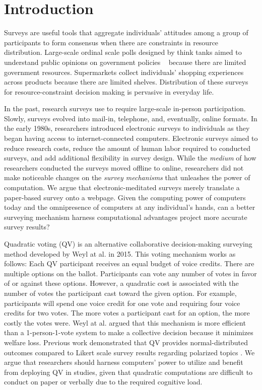 \section{Introduction}

Surveys are useful tools that aggregate individuals' attitudes among a group of participants to form consensus when there are constraints in resource distribution. 
Large-scale ordinal scale polls designed by think tanks aimed to understand public opinions on government policies ~\cite{pew} because there are limited government resources. 
Supermarkets collect individuals' shopping experiences across products because there are limited shelves.
Distribution of these surveys for resource-constraint decision making is pervasive in everyday life.

In the past, research surveys use to require large-scale in-person participation. 
Slowly, surveys evolved into mail-in, telephone, and, eventually, online formats.
In the early 1980s, researchers introduced electronic surveys to individuals as they began having access to internet-connected computers. 
Electronic surveys aimed to reduce research costs, reduce the amount of human labor required to conducted surveys, and add additional flexibility in survey design. 
While the \textit{medium} of how researchers conducted the surveys moved offline to online, researchers did not make noticeable changes on the \textit{survey mechanisms} that unleashes the power of computation. 
We argue that electronic-meditated surveys merely translate a paper-based survey onto a webpage.
Given the computing power of computers today and the omnipresence of computers at any individual's hands, can a better surveying mechanism harness computational advantages project more accurate survey results?

Quadratic voting (QV) is an alternative collaborative decision-making surveying method developed by Weyl at al. \cite{posner2018radical} in 2015. 
This voting mechanism works as follows: Each QV participant receives an equal budget of voice credits. 
There are multiple options on the ballot. Participants can vote any number of votes in favor of or against these options.
However, a quadratic cost is associated with the number of votes the participant cast toward the given option. For example, participants will spend one voice credit for one vote and requiring four voice credits for two votes. The more votes a participant cast for an option, the more costly the votes were. Weyl at al. argued that this mechanism is more efficient than a 1-person-1-vote system to make a collective decision because it minimizes welfare loss. Previous work demonstrated that QV provides normal-distributed outcomes compared to Likert scale survey results regarding polarized topics \cite{quarfoot2017quadratic}. 
We argue that researchers should harness computers' power to utilize and benefit from deploying QV in studies, given that quadratic computations are difficult to conduct on paper or verbally due to the required cognitive load.

